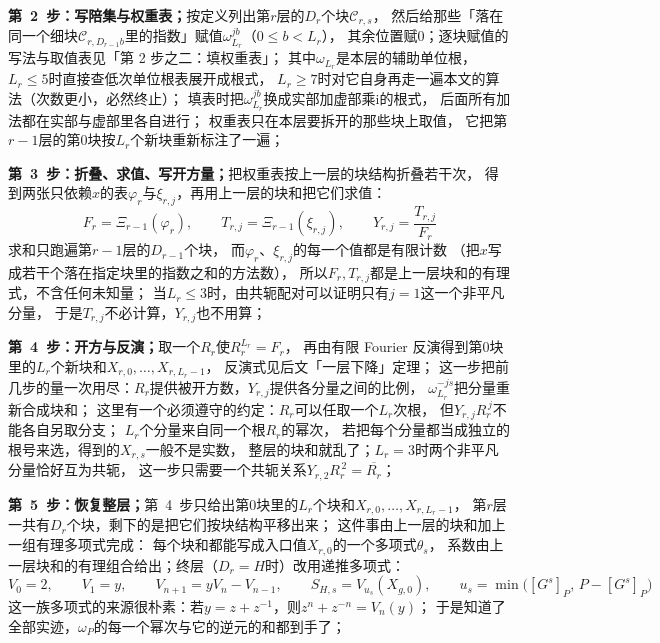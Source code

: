 \documentclass[UTF8,a4paper,11pt]{ctexart}
\newcommand{\ii}{\mathrm{i}}
\begin{document}
\textbf{第~2~步：写陪集与权重表；}按定义列出第$r$层的$D_r$个块$\mathscr{C}_{r,s}$，
然后给那些「落在同一个细块$\mathscr{C}_{r,D_{r-1}b}$里的指数」赋值$\omega_{L_r}^{jb}$（$0\le b<L_r$），
其余位置赋$0$；逐块赋值的写法与取值表见「第 2 步之二：填权重表」；
其中$\omega_{L_r}$是本层的辅助单位根，$L_r\le5$时直接查低次单位根表展开成根式，
$L_r\ge7$时对它自身再走一遍本文的算法（次数更小，必然终止）；
填表时把$\omega_{L_r}^{jb}$换成实部加虚部乘$\ii$的根式，
后面所有加法都在实部与虚部里各自进行；
权重表只在本层要拆开的那些块上取值，
它把第$r-1$层的第$0$块按$L_r$个新块重新标注了一遍；\par

\textbf{第~3~步：折叠、求值、写开方量；}把权重表按上一层的块结构折叠若干次，
得到两张只依赖$x$的表$\varphi_r$与$\xi_{r,j}$，再用上一层的块和把它们求值：
\[
 F_r=\Xi_{r-1}(\varphi_r),\qquad
 T_{r,j}=\Xi_{r-1}(\xi_{r,j}),\qquad
 Y_{r,j}=\frac{T_{r,j}}{F_r}
\]
求和只跑遍第$r-1$层的$D_{r-1}$个块，
而$\varphi_r$、$\xi_{r,j}$的每一个值都是有限计数
（把$x$写成若干个落在指定块里的指数之和的方法数），
所以$F_r,T_{r,j}$都是上一层块和的有理式，不含任何未知量；
当$L_r\le3$时，由共轭配对可以证明只有$j=1$这一个非平凡分量，
于是$T_{r,j}$不必计算，$Y_{r,j}$也不用算；\par

\textbf{第~4~步：开方与反演；}取一个$R_r$使$R_r^{L_r}=F_r$，
再由有限 Fourier 反演得到第$0$块里的$L_r$个新块和$X_{r,0},\dots,X_{r,L_r-1}$，
反演式见后文「一层下降」定理；
这一步把前几步的量一次用尽：$R_r$提供被开方数，$Y_{r,j}$提供各分量之间的比例，
$\omega_{L_r}^{-js}$把分量重新合成块和；
这里有一个必须遵守的约定：$R_r$可以任取一个$L_r$次根，
但$Y_{r,j}R_r^{\,j}$不能各自另取分支；
$L_r$个分量来自同一个根$R_r$的幂次，
若把每个分量都当成独立的根号来选，得到的$X_{r,s}$一般不是实数，
整层的块和就乱了；$L_r=3$时两个非平凡分量恰好互为共轭，
这一步只需要一个共轭关系$Y_{r,2}R_r^{\,2}=\overline{R_r}$；\par

\textbf{第~5~步：恢复整层；}第~4~步只给出第$0$块里的$L_r$个块和$X_{r,0},\dots,X_{r,L_r-1}$，
第$r$层一共有$D_r$个块，剩下的是把它们按块结构平移出来；
这件事由上一层的块和加上一组有理多项式完成：
每个块和都能写成入口值$X_{r,0}$的一个多项式$\theta_{s}$，
系数由上一层块和的有理组合给出；终层（$D_r=H$时）改用递推多项式：
\[
 V_0=2,\qquad V_1=y,\qquad V_{n+1}=yV_n-V_{n-1},\qquad
 S_{H,s}=V_{u_s}(X_{g,0}),\qquad u_s=\min\bigl([G^s]_P,\,P-[G^s]_P\bigr)
\]
这一族多项式的来源很朴素：若$y=z+z^{-1}$，则$z^n+z^{-n}=V_n(y)$；
于是知道了全部实迹，$\omega_P$的每一个幂次与它的逆元的和都到手了；\par
\end{document}
